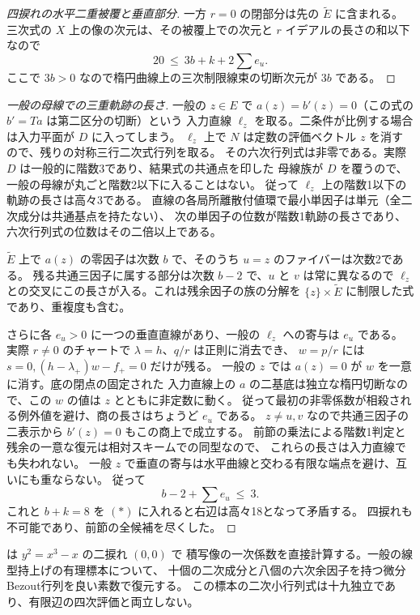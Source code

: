 \begin{proof}[四捩れの水平二重被覆と垂直部分]
一方 $r=0$ の閉部分は先の $\widetilde E$ に含まれる。
三次式の $X$ 上の像の次元は、その被覆上での次元と $r$ イデアルの長さの和以下なので
\[
                         20\ \le\ 3b+k+2\sum e_u .                 \tag{*}
\]
ここで $3b>0$ なので楕円曲線上の三次制限線束の切断次元が $3b$ である。
\end{proof}

\begin{proof}[一般の母線での三重軌跡の長さ]
一般の $z\in E$ で $a(z)=b'(z)=0$（この式の $b'=Ta$ は第二区分の切断）という
入力直線 $\ell_z$ を取る。二条件が比例する場合は入力平面が $D$ に入ってしまう。
$\ell_z$ 上で $N$ は定数の評価ベクトル $z$ を消すので、残りの対称三行二次式行列を取る。
その六次行列式は非零である。実際 $D$ は一般的に階数3であり、結果式の共通点を印した
母線族が $D$ を覆うので、一般の母線が丸ごと階数2以下に入ることはない。
従って $\ell_z$ 上の階数1以下の軌跡の長さは高々3である。
直線の各局所離散付値環で最小単因子は単元（全二次成分は共通基点を持たない）、
次の単因子の位数が階数1軌跡の長さであり、六次行列式の位数はその二倍以上である。

$\widetilde E$ 上で $a(z)$ の零因子は次数 $b$ で、そのうち $u=z$ のファイバーは次数2である。
残る共通三因子に属する部分は次数 $b-2$ で、$u$ と $v$ は常に異なるので
$\ell_z$ との交叉にこの長さが入る。これは残余因子の族の分解を
$\{z\}\times\widetilde E$ に制限した式であり、重複度も含む。

さらに各 $e_u>0$ に一つの垂直直線があり、一般の $\ell_z$ への寄与は $e_u$ である。
実際 $r\ne0$ のチャートで $\lambda=h$、$q/r$ は正則に消去でき、
$w=p/r$ には $s=0,(h-\lambda_+)w-f_+=0$ だけが残る。
一般の $z$ では $a(z)=0$ が $w$ を一意に消す。底の閉点の固定された
入力直線上の $a$ の二基底は独立な楕円切断なので、この $w$ の値は $z$ とともに非定数に動く。
従って最初の非零係数が相殺される例外値を避け、商の長さはちょうど $e_u$ である。
$z\ne u,v$ なので共通三因子の二表示から $b'(z)=0$ もこの商上で成立する。
前節の乗法による階数1判定と残余の一意な復元は相対スキームでの同型なので、
これらの長さは入力直線でも失われない。
一般 $z$ で垂直の寄与は水平曲線と交わる有限な端点を避け、互いにも重ならない。
従って
\[
                    b-2+\sum e_u\ \le\ 3 .
\]
これと $b+k=8$ を $(*)$ に入れると右辺は高々18となって矛盾する。
四捩れも不可能であり、前節の全候補を尽くした。
\end{proof}

 は $y^2=x^3-x$ の二捩れ $(0,0)$ で
積写像の一次係数を直接計算する。一般の線型持上げの有理標本について、
十個の二次成分と八個の六次余因子を持つ微分Bezout行列を良い素数で復元する。
この標本の二次小行列式は十九独立であり、有限辺の四次評価と両立しない。
